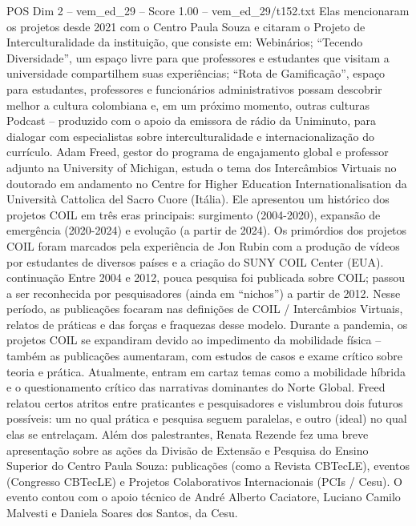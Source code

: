 \begin{textsample}{POS Dim 2 – vem\_ed\_29 – Score 1.00 – vem\_ed\_29/t152.txt}
Elas mencionaram os projetos desde 2021 com o Centro Paula Souza e citaram o Projeto de Interculturalidade da instituição, que consiste em: Webinários; “Tecendo Diversidade”, um espaço livre para que professores e estudantes que visitam a universidade compartilhem suas experiências; “Rota de Gamificação”, espaço para estudantes, professores e funcionários administrativos possam descobrir melhor a cultura colombiana e, em um próximo momento, outras culturas Podcast – produzido com o apoio da emissora de rádio da Uniminuto, para dialogar com especialistas sobre interculturalidade e internacionalização do currículo.
Adam Freed, gestor do programa de engajamento global e professor adjunto na University of Michigan, estuda o tema dos Intercâmbios Virtuais no doutorado em andamento no Centre for Higher Education Internationalisation da Università Cattolica del Sacro Cuore (Itália).
Ele apresentou um histórico dos projetos COIL em três eras principais: surgimento (2004-2020), expansão de emergência (2020-2024) e evolução (a partir de 2024).
Os primórdios dos projetos COIL foram marcados pela experiência de Jon Rubin com a produção de vídeos por estudantes de diversos países e a criação do SUNY COIL Center (EUA). continuação Entre 2004 e 2012, pouca pesquisa foi publicada sobre COIL; passou a ser reconhecida por pesquisadores (ainda em “nichos”) a partir de 2012.
Nesse período, as publicações focaram nas definições de COIL / Intercâmbios Virtuais, relatos de práticas e das forças e fraquezas desse modelo.
Durante a pandemia, os projetos COIL se expandiram devido ao impedimento da mobilidade física – também as publicações aumentaram, com estudos de casos e exame crítico sobre teoria e prática.
Atualmente, entram em cartaz temas como a mobilidade híbrida e o questionamento crítico das narrativas dominantes do Norte Global.
Freed relatou certos atritos entre praticantes e pesquisadores e vislumbrou dois futuros possíveis: um no qual prática e pesquisa seguem paralelas, e outro (ideal) no qual elas se entrelaçam.
Além dos palestrantes, Renata Rezende fez uma breve apresentação sobre as ações da Divisão de Extensão e Pesquisa do Ensino Superior do Centro Paula Souza: publicações (como a Revista CBTecLE), eventos (Congresso CBTecLE) e Projetos Colaborativos Internacionais (PCIs / Cesu).
O evento contou com o apoio técnico de André Alberto Caciatore, Luciano Camilo Malvesti e Daniela Soares dos Santos, da Cesu.

\end{textsample}
